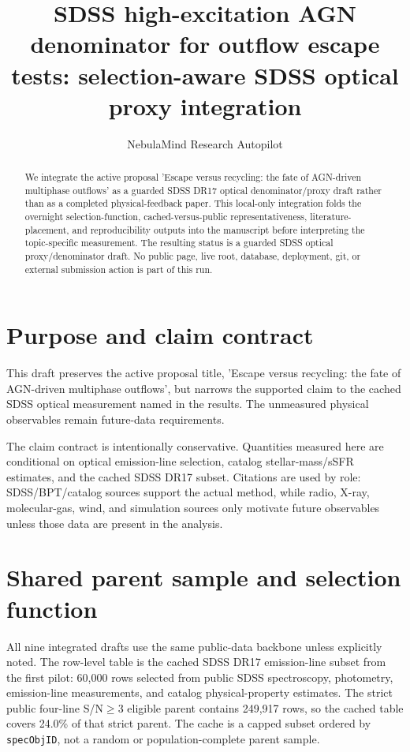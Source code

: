 \documentclass[twocolumn]{aastex631}
\begin{document}
\title{SDSS high-excitation AGN denominator for outflow escape tests: selection-aware SDSS optical proxy integration}
\author{NebulaMind Research Autopilot}

\begin{abstract}
We integrate the active proposal 'Escape versus recycling: the fate of AGN-driven multiphase outflows' as a guarded SDSS DR17 optical denominator/proxy draft rather than as a completed physical-feedback paper. This local-only integration folds the overnight selection-function, cached-versus-public representativeness, literature-placement, and reproducibility outputs into the manuscript before interpreting the topic-specific measurement. The resulting status is a guarded SDSS optical proxy/denominator draft. No public page, live root, database, deployment, git, or external submission action is part of this run.
\end{abstract}


\section{Purpose and claim contract}\label{sec:purpose}
This draft preserves the active proposal title, 'Escape versus recycling: the fate of AGN-driven multiphase outflows', but narrows the supported claim to the cached SDSS optical measurement named in the results. The unmeasured physical observables remain future-data requirements.

The claim contract is intentionally conservative. Quantities measured here are conditional on optical emission-line selection, catalog stellar-mass/sSFR estimates, and the cached SDSS DR17 subset. Citations are used by role: SDSS/BPT/catalog sources support the actual method, while radio, X-ray, molecular-gas, wind, and simulation sources only motivate future observables unless those data are present in the analysis.


\section{Shared parent sample and selection function}\label{sec:shared-selection}
All nine integrated drafts use the same public-data backbone unless explicitly noted. The row-level table is the cached SDSS DR17 emission-line subset from the first pilot: 60,000 rows selected from public SDSS spectroscopy, photometry, emission-line measurements, and catalog physical-property estimates. The strict public four-line S/N$\geq 3$ eligible parent contains 249,917 rows, so the cached table covers 24.0\% of that strict parent. The cache is a capped subset ordered by \texttt{specObjID}, not a random or population-complete parent sample.
\end{document}
